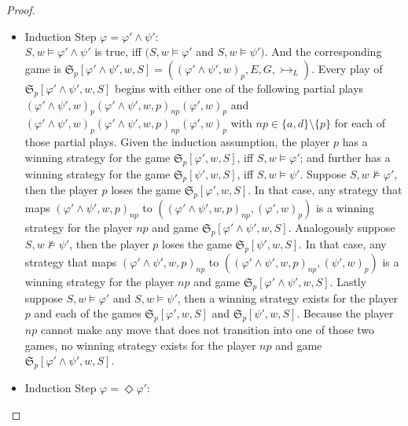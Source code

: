 \documentclass[a4paper,american]{paper}
\theoremstyle{definition}\newtheorem{definition}{Definition}
\begin{document}
\begin{proof}
\begin{itemize}
\item Induction Step $\varphi=\varphi'\wedge\psi'$:\\
$S,w\vDash\varphi'\wedge\psi'$ is true, iff $(S,w\vDash\varphi'$ and $S,w\vDash\psi')$. And the corresponding game is $\mathfrak{S}_p[\varphi'\wedge\psi',w,S]=((\varphi'\wedge\psi' ,w)_p, E, G, \rightarrowtail_L)$. Every play of $\mathfrak{S}_p[\varphi'\wedge\psi',w,S]$ begins with either one of the following partial plays $(\varphi'\wedge\psi' ,w)_p(\varphi'\wedge\psi' ,w,p)_{np}(\varphi' ,w)_p$ and $(\varphi'\wedge\psi' ,w)_p(\varphi'\wedge\psi' ,w,p)_{np}(\varphi' ,w)_p$ with $np\in\{a,d\}\setminus{}\{p\}$ for each of those partial plays. Given the induction assumption, the player $p$ has a winning strategy for the game $\mathfrak{S}_{p}[\varphi' ,w,S]$, iff $S,w\vDash\varphi'$; and further has a winning strategy for the game $\mathfrak{S}_{p}[\psi' ,w,S]$, iff $S,w\vDash\psi'$. Suppose $S,w\nvDash\varphi'$, then the player $p$ loses the game $\mathfrak{S}_{p}[\varphi' ,w,S]$. In that case, any strategy that maps $(\varphi'\wedge\psi',w,p)_{np}$ to $((\varphi'\wedge\psi' ,w,p)_{np},(\varphi' ,w)_p)$ is a winning strategy for the player $np$ and game $\mathfrak{S}_p[\varphi'\wedge\psi',w,S]$. Analogously suppose $S,w\nvDash\psi'$, then the player $p$ loses the game $\mathfrak{S}_{p}[\psi' ,w,S]$. In that case, any strategy that maps $(\varphi'\wedge\psi',w,p)_{np}$ to $((\varphi'\wedge\psi' ,w,p)_{np},(\psi' ,w)_p)$ is a winning strategy for the player $np$ and game $\mathfrak{S}_p[\varphi'\wedge\psi',w,S]$. Lastly suppose $S,w\vDash\varphi'$ and $S,w\vDash\psi'$, then a winning strategy exists for the player $p$ and each of the games $\mathfrak{S}_{p}[\varphi' ,w,S]$ and $\mathfrak{S}_{p}[\psi' ,w,S]$. Because the player $np$ cannot make any move that does not transition into one of those two games, no winning strategy exists for the player $np$ and game $\mathfrak{S}_p[\varphi'\wedge\psi',w,S]$.
\newpage
\item Induction Step $\varphi=\Diamond\varphi'$:\\

\end{itemize}
\end{proof}
\end{document}
